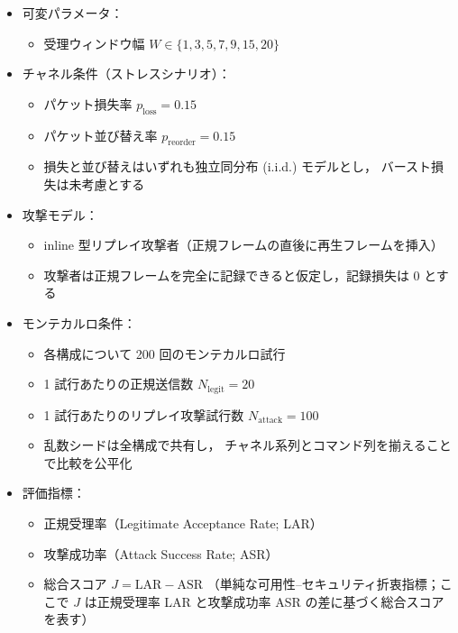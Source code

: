 \documentclass[twocolumn,10pt,a4paper]{jsarticle}
\begin{document}
\begin{itemize}
  \item 可変パラメータ：
    \begin{itemize}
      \item 受理ウィンドウ幅 $W \in \{1, 3, 5, 7, 9, 15, 20\}$
    \end{itemize}
  \item チャネル条件（ストレスシナリオ）：
    \begin{itemize}
      \item パケット損失率 $p_{\mathrm{loss}} = 0.15$
      \item パケット並び替え率 $p_{\mathrm{reorder}} = 0.15$
      \item 損失と並び替えはいずれも独立同分布 (i.i.d.) モデルとし，
            バースト損失は未考慮とする
    \end{itemize}
  \item 攻撃モデル：
    \begin{itemize}
      \item inline 型リプレイ攻撃者（正規フレームの直後に再生フレームを挿入）
      \item 攻撃者は正規フレームを完全に記録できると仮定し，記録損失は 0 とする
    \end{itemize}
  \item モンテカルロ条件：
    \begin{itemize}
      \item 各構成について 200 回のモンテカルロ試行
      \item 1 試行あたりの正規送信数 $N_{\mathrm{legit}} = 20$
      \item 1 試行あたりのリプレイ攻撃試行数 $N_{\mathrm{attack}} = 100$
      \item 乱数シードは全構成で共有し，
            チャネル系列とコマンド列を揃えることで比較を公平化
    \end{itemize}
  \item 評価指標：
    \begin{itemize}
      \item 正規受理率（Legitimate Acceptance Rate; LAR）
      \item 攻撃成功率（Attack Success Rate; ASR）
      \item 総合スコア $J = \mathrm{LAR} - \mathrm{ASR}$
            （単純な可用性--セキュリティ折衷指標；ここで $J$ は正規受理率 LAR と攻撃成功率 ASR の差に基づく総合スコアを表す）
    \end{itemize}
\end{itemize}
\end{document}
